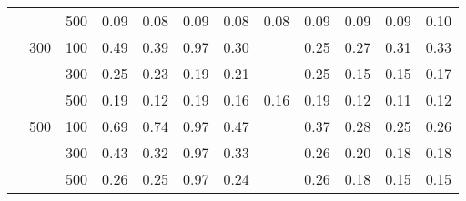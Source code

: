 \begin{longtable}{lll|p{1cm}p{1cm}p{1cm}p{1cm}p{1cm}p{1cm}p{1cm}p{1cm}p{1cm}}
     &     & 500 &    0.09 &            0.08 &            0.09 &           0.08 &              0.08 &                      0.09 &                      0.09 &                       0.09 &                    0.10 \\
     & 300 & 100 &    0.49 &            0.39 &            0.97 &           0.30 &                   &                      0.25 &                      0.27 &                       0.31 &                    0.33 \\
     &     & 300 &    0.25 &            0.23 &            0.19 &           0.21 &                   &                      0.25 &                      0.15 &                       0.15 &                    0.17 \\
     &     & 500 &    0.19 &            0.12 &            0.19 &           0.16 &              0.16 &                      0.19 &                      0.12 &                       0.11 &                    0.12 \\
     & 500 & 100 &    0.69 &            0.74 &            0.97 &           0.47 &                   &                      0.37 &                      0.28 &                       0.25 &                    0.26 \\
     &     & 300 &    0.43 &            0.32 &            0.97 &           0.33 &                   &                      0.26 &                      0.20 &                       0.18 &                    0.18 \\
     &     & 500 &    0.26 &            0.25 &            0.97 &           0.24 &                   &                      0.26 &                      0.18 &                       0.15 &                    0.15 \\
\end{longtable}
